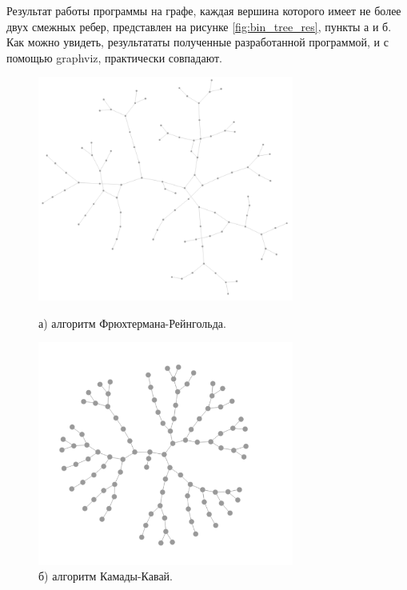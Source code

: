 \documentclass[14pt, russian]{scrartcl}
\begin{document}
Результат работы программы на графе, каждая вершина которого имеет не более двух смежных ребер, представлен на рисунке \ref{fig:bin_tree_res}, пункты а и б. Как можно увидеть, результататы полученные разработанной программой, и с помощью graphviz, практически совпадают.
\begin{figure}[H]
\centering
  \begin{minipage}[t]{.45\textwidth}
  \centering
\includegraphics[width=0.75\textwidth]{./imgs/fr_btree.png}
  \caption*{а) алгоритм Фрюхтермана-Рейнгольда.}
  \end{minipage}
  \noindent
  \begin{minipage}[t]{.50\textwidth}
  \centering
\includegraphics[width=0.75\textwidth]{./imgs/kk_btree.png}
  \caption*{б) алгоритм Камады-Кавай.}
  \end{minipage}
  \begin{minipage}[t]{.55\textwidth}
  \centering

\end{minipage}
\end{figure}
\end{document}
